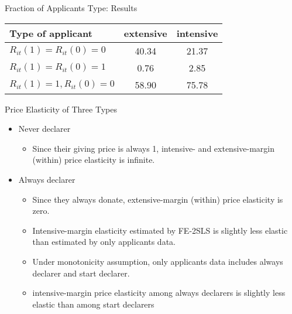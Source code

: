\documentclass[
  ignorenonframetext,
  aspectratio=169,
]{beamer}
\providecommand{\tightlist}{%
  \setlength{\itemsep}{0pt}\setlength{\parskip}{0pt}}
\begin{document}
\begin{frame}{Fraction of Applicants Type: Results}
\protect\hypertarget{fraction-of-applicants-type-results}{}
\begin{table}
\centering
\begin{tabular}[t]{lcc}
\toprule
Type of applicant & extensive & intensive\\
\midrule
$R_{it}(1) = R_{it}(0) = 0$ & \num{40.34} & \num{21.37}\\
$R_{it}(1) = R_{it}(0) = 1$ & \num{0.76} & \num{2.85}\\
$R_{it}(1) =1, R_{it}(0) = 0$ & \num{58.90} & \num{75.78}\\
\bottomrule
\end{tabular}
\end{table}
\end{frame}

\begin{frame}{Price Elasticity of Three Types}
\protect\hypertarget{price-elasticity-of-three-types}{}
\begin{itemize}
\tightlist
\item
  Never declarer

  \begin{itemize}
  \tightlist
  \item
    Since their giving price is always 1,
    intensive- and extensive-margin (within) price elasticity is infinite.
  \end{itemize}
\item
  Always declarer

  \begin{itemize}
  \tightlist
  \item
    Since they always donate,
    extensive-margin (within) price elasticity is zero.
  \item
    Intensive-margin elasticity estimated by FE-2SLS
    is slightly less elastic than estimated by only applicants data.
  \item
    Under monotonicity assumption, only applicants data includes
    always declarer and start declarer.
  \item
    intensive-margin price elasticity among always declarers
    is slightly less elastic than among start declarers
  \end{itemize}
\end{itemize}
\end{frame}
\end{document}
